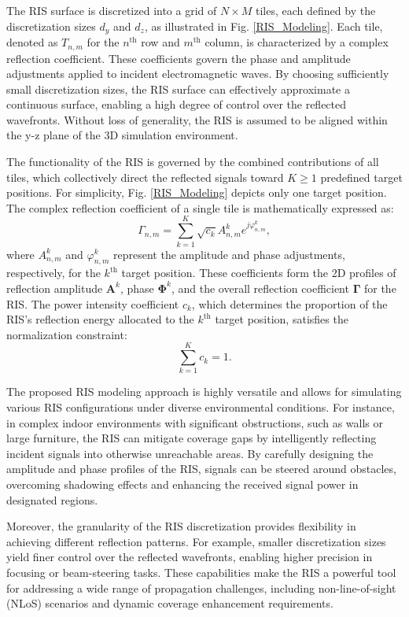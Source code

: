 \documentclass{IEEEoj}
\begin{document}
The RIS surface is discretized into a grid of \(N \times M\) tiles, each defined by the discretization sizes \(d_y\) and \(d_z\), as illustrated in Fig. \ref{RIS_Modeling}. Each tile, denoted as \(T_{n,m}\) for the \(n^{\text{th}}\) row and \(m^{\text{th}}\) column, is characterized by a complex reflection coefficient. These coefficients govern the phase and amplitude adjustments applied to incident electromagnetic waves. By choosing sufficiently small discretization sizes, the RIS surface can effectively approximate a continuous surface, enabling a high degree of control over the reflected wavefronts. Without loss of generality, the RIS is assumed to be aligned within the y-z plane of the 3D simulation environment.

The functionality of the RIS is governed by the combined contributions of all tiles, which collectively direct the reflected signals toward \(K \geq 1\) predefined target positions. For simplicity, Fig. \ref{RIS_Modeling} depicts only one target position. The complex reflection coefficient of a single tile is mathematically expressed as:
\[
\Gamma_{n,m} = \sum \limits_{k=1}^K \sqrt{c_k} A_{n,m}^k e^{j \varphi_{n,m}^k},
\]
where \(A_{n,m}^k\) and \(\varphi_{n,m}^k\) represent the amplitude and phase adjustments, respectively, for the \(k^{\text{th}}\) target position. These coefficients form the 2D profiles of reflection amplitude \(\mathbf{A}^k\), phase \(\mathbf{\Phi}^k\), and the overall reflection coefficient \(\mathbf{\Gamma}\) for the RIS. The power intensity coefficient \(c_k\), which determines the proportion of the RIS's reflection energy allocated to the \(k^{\text{th}}\) target position, satisfies the normalization constraint:
\[
\sum_{k=1}^K c_k = 1.
\]

The proposed RIS modeling approach is highly versatile and allows for simulating various RIS configurations under diverse environmental conditions. For instance, in complex indoor environments with significant obstructions, such as walls or large furniture, the RIS can mitigate coverage gaps by intelligently reflecting incident signals into otherwise unreachable areas. By carefully designing the amplitude and phase profiles of the RIS, signals can be steered around obstacles, overcoming shadowing effects and enhancing the received signal power in designated regions.

Moreover, the granularity of the RIS discretization provides flexibility in achieving different reflection patterns. For example, smaller discretization sizes yield finer control over the reflected wavefronts, enabling higher precision in focusing or beam-steering tasks. These capabilities make the RIS a powerful tool for addressing a wide range of propagation challenges, including non-line-of-sight (NLoS) scenarios and dynamic coverage enhancement requirements.
\end{document}
